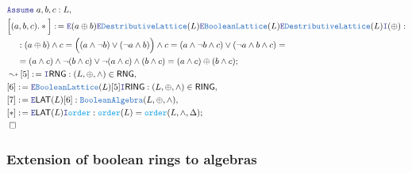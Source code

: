 \documentclass[12pt]{scrartcl}
\newcommand{\TYPE}[1]{\textcolor{NavyBlue}{\mathtt{#1}}}
\newcommand{\FUNC}[1]{\textcolor{Cerulean}{\mathtt{#1}}}
\newcommand{\LOGIC}[1]{\textcolor{Blue}{\mathtt{#1}}}
\renewcommand{\.}{\; . \;}
\newcommand{\de}{: \kern 0.1pc =}
\newcommand{\NewLine}{\\ & \kern 1pc}
\newcommand{\Page}[1]{ \begin{align*} #1 \end{align*}   }
\newcommand{\Intro}{\LOGIC{I}}
\newcommand{\Elim}{\LOGIC{E}}
\newcommand{\Say}[3]{& #1 \de #2 : #3, \\}
\newcommand{\Conclude}[3]{& #1 \de #2 : #3; \\}
\newcommand{\Derive}[3]{& \leadsto #1 \de #2 : #3, \\}
\newcommand{\Assume}[2]{& \LOGIC{Assume} \; #1 : #2, \\}
\newcommand{\QED}{\; \square}
\newcommand{\EndProof}{& \QED \\}
\newcommand{\RING}{\mathsf{RING}}
\newcommand{\RNG}{\mathsf{RNG}}
\newcommand{\BA}{\TYPE{BooleanAlgebra}}
\newcommand{\BL}{\TYPE{BooleanLattice}}
\begin{document}
{{	}
}\Page{
	\Assume{a,b,c}{L}
	\Conclude{\Big[(a,b,c).*\Big]}
	{
		\Elim (a \oplus b)
		\Elim \TYPE{DestributiveLattice}(L)
		\Elim \BL(L)
		\Elim \TYPE{DestributiveLattice}(L)
		\Intro (\oplus)
	}
	{
		\NewLine :
		( a \oplus b) \wedge c = 
		\Big( (a \wedge \neg b) \vee (\neg a \wedge b) \Big) \wedge c =
		(a \wedge \neg b \wedge  c) \vee (\neg a \wedge b \wedge c) =
		\NewLine = 
		(a \wedge c) \wedge \neg(b \wedge c) \vee \neg(a \wedge c) \wedge (b \wedge c) =
		(a \wedge c) \oplus (b \wedge c)
	}
	\Derive{[5]}{\Intro \RNG}{ (L,\oplus,\wedge) \in \RNG }
	\Say{[6]}{\Elim \BL(L) [5] \Intro \RING}{(L,\oplus,\wedge) \in \RING}
	\Say{[7]}{\Elim \mathsf{LAT}(L)[6]}{\BA(L,\oplus,\wedge)}
	\Conclude{[*]}{\Elim \mathsf{LAT}(L)\Intro \FUNC{order}}
	{
		\FUNC{order}(L) = \FUNC{order}(L,\wedge,\Delta)	
	}
	\EndProof
}
\newpage
\subsubsection{Extension of boolean rings to algebras}
\end{document}
